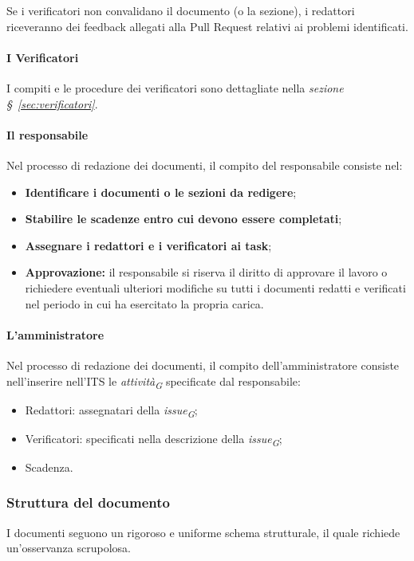Se i verificatori non convalidano il documento (o la sezione), i redattori riceveranno dei feedback allegati alla Pull Request relativi ai problemi identificati.

\paragraph{I Verificatori}
I compiti e le procedure dei verificatori sono dettagliate nella \textit{sezione \S~\ref{sec:verificatori}}.

\paragraph{Il responsabile}
Nel processo di redazione dei documenti, il compito del responsabile consiste nel:
\begin{itemize}
    \item \textbf{Identificare i documenti o le sezioni da redigere};
    \item \textbf{Stabilire le scadenze entro cui devono essere completati};
    \item \textbf{Assegnare i redattori e i verificatori ai task};
    \item \textbf{Approvazione:} il responsabile si riserva il diritto di approvare il lavoro o richiedere eventuali ulteriori modifiche su tutti i documenti redatti e verificati nel periodo in cui ha esercitato la propria carica.
\end{itemize}

\paragraph{L'amministratore}
Nel processo di redazione dei documenti, il compito dell'amministratore consiste nell'inserire nell'ITS le \textit{attività}\textsubscript{\textit{G}} specificate dal responsabile:
    \begin{itemize}
        \item Redattori: assegnatari della \textit{issue}\textsubscript{\textit{G}};
        \item Verificatori: specificati nella descrizione della \textit{issue}\textsubscript{\textit{G}};
        \item Scadenza.
    \end{itemize}

\subsubsection{Struttura del documento}
\label{subsubsec:strutturadocumento}
I documenti seguono un rigoroso e uniforme schema strutturale, il quale richiede un'osservanza scrupolosa.

